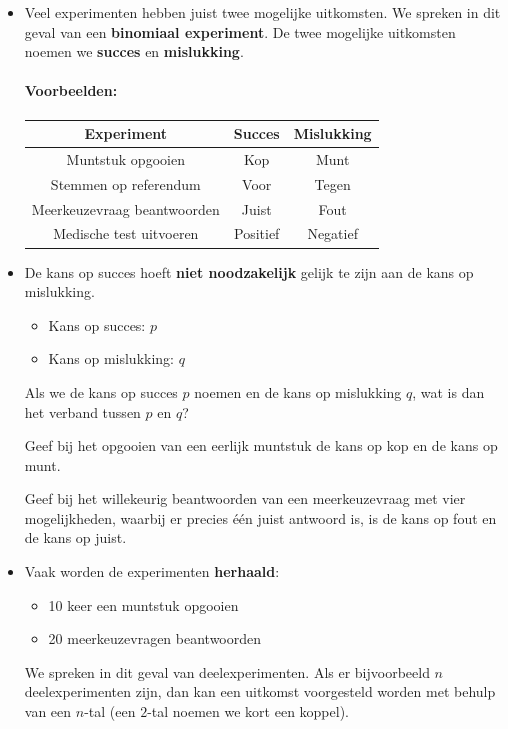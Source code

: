 \documentclass[12pt,twoside]{article}
\begin{document}
\begin{itemize}
  \item Veel experimenten hebben juist twee mogelijke uitkomsten. We spreken in dit geval van een {\bf binomiaal experiment}. De twee mogelijke uitkomsten noemen we {\bf succes} en {\bf mislukking}.
  \paragraph*{Voorbeelden:}
  \begin{center}
    \begin{tabular}{c|c|c}
    Experiment & Succes & Mislukking\\
    \hline
    Muntstuk opgooien & Kop & Munt\\
    Stemmen op referendum & Voor & Tegen\\
    Meerkeuzevraag beantwoorden & Juist & Fout\\
    Medische test uitvoeren & Positief & Negatief\\
    \end{tabular}
  \end{center}
  \item De kans op succes hoeft {\bf niet noodzakelijk} gelijk te zijn aan de kans op mislukking.
  \begin{itemize}
    \item Kans op succes: $p$
    \item Kans op mislukking: $q$
  \end{itemize}
  \begin{oefening}
  Als we de kans op succes $p$ noemen en de kans op mislukking $q$, wat is dan het verband tussen $p$ en $q$?\\
  \end{oefening}
  \begin{oefening}
  Geef bij het opgooien van een eerlijk muntstuk de kans op kop en de kans op munt.
  \end{oefening}
  \begin{oefening}
  Geef bij het willekeurig beantwoorden van een meerkeuzevraag met vier mogelijkheden, waarbij er precies één juist antwoord is, is de kans op fout en de kans op juist.
  \end{oefening}

  \item Vaak worden de experimenten {\bf herhaald}:
  \begin{itemize}
    \item 10 keer een muntstuk opgooien
    \item 20 meerkeuzevragen beantwoorden
  \end{itemize}
  We spreken in dit geval van deelexperimenten. Als er bijvoorbeeld $n$ deelexperimenten zijn, dan kan een uitkomst voorgesteld worden met behulp van een $n$-tal (een $2$-tal noemen we kort een koppel).
\end{itemize}
\end{document}
